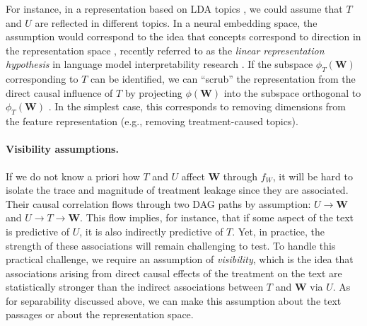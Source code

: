 \documentclass[11pt]{article}
\newcommand{\bW}{\bm{W}}  %
\begin{document}
For instance, in a representation based on LDA topics \citep{blei2003}, we could assume that $T$ and $U$ are reflected in different topics. In a neural embedding space, the assumption would correspond to the idea that concepts correspond to direction in the representation space \citep{mikolov2013linguistic}, recently referred to as the \emph{linear representation hypothesis} in language model interpretability research \citep{park2024linear}.
%
If the subspace $\phi_T(\bW)$ corresponding to $T$ can be identified, we can ``scrub'' the representation from the direct causal influence of $T$ by projecting $\phi(\bW)$ into the subspace orthogonal to $\phi_T(\bW)$  \citep{ravfogel2020}. In the simplest case, this corresponds to removing dimensions from the feature representation (e.g., removing treatment-caused topics).

\paragraph{Visibility assumptions.}
If we do not know a priori how $T$ and $U$ affect $\bW$ through $f_W$, it will be hard to isolate the trace and magnitude of treatment leakage since they are associated. Their causal correlation flows through two DAG paths by assumption: $U \to \bW$ and $U \to T \to \bW$.  This flow implies, for instance, that if some aspect of the text is predictive of $U$, it is also indirectly predictive of $T$. Yet, in practice, the strength of these associations will remain challenging to test.
%
%
To handle this practical challenge, we require an assumption of \emph{visibility},
which is the idea that associations arising from direct causal effects of the treatment on the text %
are statistically stronger than the indirect associations between $T$ and $\bW$ via $U$. %
%
As for separability discussed above, we can make this assumption about the text passages or about the representation space.
%
\end{document}
